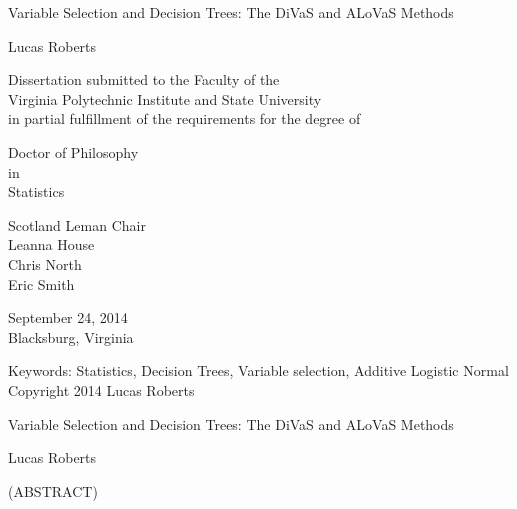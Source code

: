 \documentclass[12pt]{report}
\begin{document}
\thispagestyle{empty}
\begin{center}

{\Large 
Variable Selection and Decision Trees: The DiVaS and ALoVaS Methods
}

\vfill

Lucas Roberts

\vfill

Dissertation submitted to the Faculty of the \\
Virginia Polytechnic Institute and State University \\
in partial fulfillment of the requirements for the degree of

\vfill

Doctor of Philosophy \\
in \\
Statistics

\vfill

Scotland Leman Chair \\
Leanna House \\
Chris North \\
Eric Smith

\vfill

September 24, 2014 \\
Blacksburg, Virginia

\vfill

Keywords: Statistics, Decision Trees, Variable selection, Additive Logistic Normal
\\
Copyright 2014 Lucas Roberts

\end{center}

\pagebreak

\thispagestyle{empty}
\begin{center}

{\large Variable Selection and Decision Trees: The DiVaS and ALoVaS Methods
}

\vfill

Lucas Roberts

\vfill

(ABSTRACT)

\vfill

\end{center}
\end{document}
